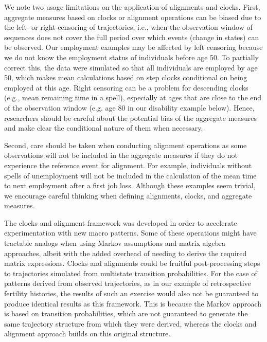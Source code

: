 \documentclass[a4paper,left=1.25cm,right=1.25cm,top=1.25cm,bottom=1.25cm]{article}
\begin{document}
We note two usage limitations on the application of alignments and clocks. First, aggregate measures based on clocks or alignment operations can be biased due to the left- or right-censoring of trajectories, i.e., when the observation window of sequences does not cover the full period over which events (change in states) can be observed. Our employment examples may be affected by left censoring because we do not know the employment status of individuals before age 50. To partially correct this, the data were simulated so that all individuals are employed by age 50, which makes mean calculations based on step clocks conditional on being employed at this age. Right censoring can be a problem for descending clocks (e.g., mean remaining time in a spell), especially at ages that are close to the end of the observation window (e.g. age 80 in our disability example below). Hence, researchers should be careful about the potential bias of the aggregate measures and make clear the conditional nature of them when necessary.

Second, care should be taken when conducting alignment operations as some observations will not be included in the aggregate measures if they do not experience the reference event for alignment. For example, individuals without spells of unemployment will not be included in the calculation of the mean time to next employment after a first job loss. Although these examples seem trivial, we encourage careful thinking when defining alignments, clocks, and aggregate measures.

The clocks and alignment framework was developed in order to accelerate experimentation with new macro patterns. Some of these operations might have tractable analogs when using Markov assumptions and matrix algebra approaches, albeit with the added overhead of needing to derive the required matrix expressions. Clocks and alignments could be fruitful post-processing steps to trajectories simulated from multistate transition probabilities. For the case of patterns derived from observed trajectories, as in our example of retrospective fertility histories, the results of such an exercise would also not be guaranteed to produce identical results as this framework. This is because the Markov approach is based on transition probabilities, which are not guaranteed to generate the same trajectory structure from which they were derived, whereas the clocks and alignment approach builds on this original structure. 
\end{document}
